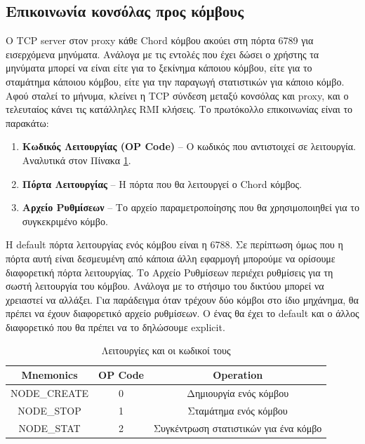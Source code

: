 \documentclass[a4paper]{article}
\begin{document}
\subsection{Επικοινωνία κονσόλας προς κόμβους}
Ο TCP server στον proxy κάθε Chord κόμβου ακούει στη πόρτα 6789 για εισερχόμενα
μηνύματα. Ανάλογα με τις εντολές που έχει δώσει ο χρήστης τα μηνύματα μπορεί να
είναι είτε για το ξεκίνημα κάποιου κόμβου, είτε για το σταμάτημα κάποιου κόμβου,
είτε για την παραγωγή στατιστικών για κάποιο κόμβο. Αφού σταλεί το μήνυμα,
κλείνει η TCP σύνδεση μεταξύ κονσόλας και proxy, και ο τελευταίος κάνει τις
κατάλληλες RMI κλήσεις. Το πρωτόκολλο επικοινωνίας είναι το παρακάτω:
\begin{enumerate}
\item \textbf{Κωδικός Λειτουργίας (OP Code)} -- Ο κωδικός που αντιστοιχεί σε
λειτουργία. Αναλυτικά στον Πίνακα \ref{tab:opcodes}.
\item \textbf{Πόρτα Λειτουργίας} -- Η πόρτα που θα λειτουργεί ο Chord κόμβος.
\item \textbf{Αρχείο Ρυθμίσεων} -- Το αρχείο παραμετροποίησης που θα
χρησιμοποιηθεί για το συγκεκριμένο κόμβο.
\end{enumerate}

Η default πόρτα λειτουργίας ενός κόμβου είναι η 6788. Σε περίπτωση όμως που η
πόρτα αυτή είναι δεσμευμένη από κάποια άλλη εφαρμογή μπορούμε να ορίσουμε
διαφορετική πόρτα λειτουργίας. Το Αρχείο Ρυθμίσεων περιέχει ρυθμίσεις για
τη σωστή λειτουργία του κόμβου. Ανάλογα με το στήσιμο του δικτύου μπορεί να
χρειαστεί να αλλάξει. Για παράδειγμα όταν τρέχουν δύο κόμβοι στο ίδιο μηχάνημα,
θα πρέπει να έχουν διαφορετικό αρχείο ρυθμίσεων. Ο ένας θα έχει το default και ο
άλλος διαφορετικό που θα πρέπει να το δηλώσουμε explicit.

\begin{table}[h!b!p!]
\begin{center}
\begin{tabular}{| c | c | c |}
\hline
\textbf{Mnemonics} & \textbf{OP Code} & \textbf{Operation}\\
\hline
\hline
NODE\_CREATE & 0 & Δημιουργία ενός κόμβου\\
\hline
NODE\_STOP & 1 & Σταμάτημα ενός κόμβου\\
\hline
NODE\_STAT & 2 & Συγκέντρωση στατιστικών για ένα κόμβο\\
\hline
\end{tabular}
\end{center}
\caption{Λειτουργίες και οι κωδικοί τους}
\label{tab:opcodes}
\end{table}
\end{document}
